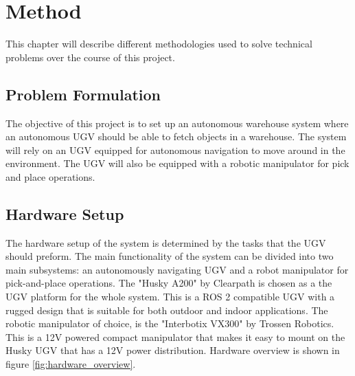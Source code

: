 \chapter{Method}




This chapter will describe different methodologies used to solve technical problems over the course of this project.

\section{Problem Formulation}

The objective of this project is to set up an autonomous warehouse system where an autonomous UGV should be able to fetch objects in a warehouse. The system will rely on an UGV equipped for autonomous navigation to move around in the environment. The UGV will also be equipped with a robotic manipulator for pick and place operations.

\section{Hardware Setup}
The hardware setup of the system is determined by the tasks that the UGV should preform. The main functionality of the system can be divided into two main subsystems: an autonomously navigating UGV and a robot manipulator for pick-and-place operations. The "Husky A200" by Clearpath is chosen as a the UGV platform for the whole system. This is a ROS 2 compatible UGV with a rugged design that is suitable for both outdoor and indoor applications. The robotic manipulator of choice, is the "Interbotix VX300" by Trossen Robotics. This is a 12V powered compact manipulator that makes it easy to mount on the Husky UGV that has a 12V power distribution. Hardware overview is shown in figure \ref{fig:hardware_overview}.

